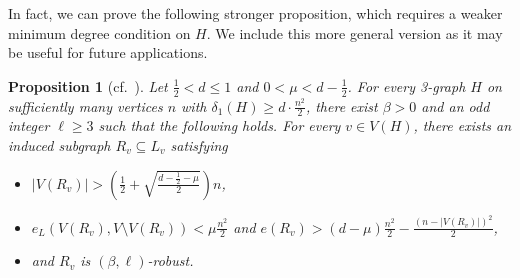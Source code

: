 \documentclass[A4paper,12pt]{article}
\newtheorem{prop}[thm]{Proposition}
\theoremstyle{definition}
\begin{document}
In fact, we can prove the following stronger proposition, which requires a weaker minimum degree condition on $H$. We include this more general version as it may be useful for future applications. 
\begin{prop}[cf.~{\cite[Prop.~2.3]{3hamcycle}}]
\label{prop:robust_alt} Let $ \frac{1}{2}<d\le1$ and $0 < \mu < d-\frac{1}{2}$. For every 3-graph $H$ on sufficiently many vertices $n$ with $\delta_1(H) \geq d\cdot\frac{n^2}{2}$, there exist $\beta>0$ and an odd integer $\ell\geq 3$ such that the following holds. For every $v \in V(H)$, there exists an induced subgraph $R_v\subseteq L_v$ satisfying 
\begin{itemize}
\item[(i)] $|V(R_v)|> \left(\frac{1}{2}+\sqrt{\frac{d-\frac{1}{2}-\mu}{2}}\right)n$,
\item[(ii)] $e_L(V(R_v),V\setminus V(R_v))
<\mu \frac{n^2}{2}$ and $e(R_v)> \left(d - \mu\right)\frac{n^2}{2}-\frac{(n-|V(R_v)|)^2}{2}$,
\item[(iii)] and $R_v$ is $(\beta,\ell)$-robust. 
\end{itemize}
\end{prop}
\end{document}
